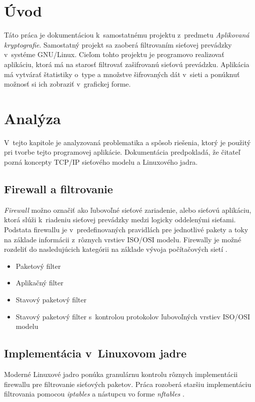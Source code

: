
\chapter*{Úvod}
Táto práca je dokumentáciou k~samostatnému projektu z~predmetu \emph{Aplikovaná kryptografie}. Samostatný projekt sa zaoberá filtrovaním sieťovej prevádzky v~systéme GNU/Linux. Cieľom tohto projektu je programovo realizovať aplikáciu, ktorá má na starosť filtrovať zašifrovanú sieťovú prevádzku. Aplikácia má vytvárať štatistiky o~type a množstve šifrovaných dát v~sieti a ponúknuť možnosť si ich zobraziť v~grafickej forme. 

\chapter{Analýza}
V~tejto kapitole je analyzovaná problematika a spôsob riešenia, ktorý je použitý pri tvorbe tejto programovej aplikácie. Dokumentácia predpokladá, že čitateľ pozná koncepty TCP/IP sieťového modelu a Linuxového jadra.

\section{Firewall a filtrovanie}
\emph{Firewall} možno označiť ako ľubovoľné sieťové zariadenie, alebo sieťovú aplikáciu, ktorá slúži k~riadeniu sieťovej prevádzky medzi logicky oddelenými sieťami. Podstata firewallu je v~predefinovaných pravidlách pre jednotlivé pakety a toky na základe informácii z~rôznych vrstiev ISO/OSI modelu. Firewally je možné rozdeliť do nasledujúcich kategórii na základe vývoja počítačových sietí \cite{Oppliger1997}. 

\begin{itemize}
	\itemsep0em 
	\item Paketový filter
	\item Aplikačný filter
	\item Stavový paketový filter
	\item Stavový paketový filter s~kontrolou protokolov ľubovoľných vrstiev ISO/OSI modelu
\end{itemize}

\section{Implementácia v~Linuxovom jadre}
Moderné Linuxové jadro ponúka granulárnu kontrolu rôznych implementácii firewallu pre filtrovanie sieťových paketov. Práca rozoberá staršiu implementáciu filtrovania pomocou \emph{iptables} a nástupcu vo forme \emph{nftables} \cite{manpages}.

